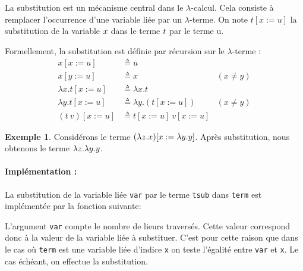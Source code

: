 \documentclass {article}
\newcommand{\codefrom}[3]
           {}
\theoremstyle{definition}
\newtheorem{example}{Exemple}
\theoremstyle{remark}
\newcommand{\fun}[1]{\lstinline!#1!}
\begin{document}
\newcommand{\subst}[3]{#1[#2 := #3]}

La substitution est un mécanisme central dans le $\lambda$-calcul. Cela consiste 
à remplacer l'occurrence d'une variable liée par un \(\lambda\)-terme.
On note \(\subst{t}{x}{u}\) la substitution de la variable $x$ dans le terme $t$ par le 
terme u.

Formellement, la substitution est définie par récursion sur le $\lambda$-terme : 
\begin{align*}
    \subst{x}{x}{u} &\triangleq u \\
    \subst{x}{y}{u} &\triangleq x & (x \neq y)\\
    \subst{\lambda x.t}{x}{u} &\triangleq \lambda x.t \\
    \subst{\lambda y.t}{x}{u} &\triangleq \lambda y. (\subst{t}{x}{u}) & (x \neq y)\\
    \subst{(t\: v)}{x}{u} &\triangleq \subst{t}{x}{u}\: \subst{v}{x}{u}
\end{align*}

\begin{example}
  Considérons le terme $\subst{(\Lam{z}{x})}{x}{\Lam{y}{y}}$. Après substitution, nous obtenons le terme $\lambda z. \lambda y. y$.
\end{example}


\paragraph{Implémentation :} 
La substitution de la variable liée \lstinline!var! par le terme
\lstinline!tsub! dans \lstinline!term! est implémentée par la fonction suivante:
%
\codefrom{untyped}{lambda}{substitution}

L'argument \fun{var} compte le nombre de lieurs traversés.
Cette valeur correspond donc à la valeur de la variable liée à substituer. C'est pour cette
raison que dans le cas où \fun{term} est une variable liée d'indice \fun{x} on teste l'égalité entre 
\fun{var} et \fun{x}. Le cas échéant, on effectue la substitution.
\end{document}
